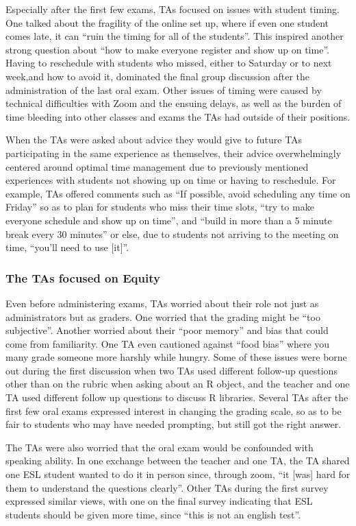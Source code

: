 \documentclass[
  letterpaper,
  DIV=11,
  numbers=noendperiod]{scrartcl}
\begin{document}
Especially after the first few exams, TAs focused on issues with student
timing. One talked about the fragility of the online set up, where if
even one student comes late, it can ``ruin the timing for all of the
students''. This inspired another strong question about ``how to make
everyone register and show up on time''. Having to reschedule with
students who missed, either to Saturday or to next week,and how to avoid
it, dominated the final group discussion after the administration of the
last oral exam. Other issues of timing were caused by technical
difficulties with Zoom and the ensuing delays, as well as the burden of
time bleeding into other classes and exams the TAs had outside of their
positions.

When the TAs were asked about advice they would give to future TAs
participating in the same experience as themselves, their advice
overwhelmingly centered around optimal time management due to previously
mentioned experiences with students not showing up on time or having to
reschedule. For example, TAs offered comments such as ``If possible,
avoid scheduling any time on Friday'' so as to plan for students who
miss their time slots, ``try to make everyone schedule and show up on
time'', and ``build in more than a 5 minute break every 30 minutes'' or
else, due to students not arriving to the meeting on time, ``you'll need
to use {[}it{]}''.

\hypertarget{the-tas-focused-on-equity}{%
\subsubsection{The TAs focused on
Equity}\label{the-tas-focused-on-equity}}

Even before administering exams, TAs worried about their role not just
as administrators but as graders. One worried that the grading might be
``too subjective''. Another worried about their ``poor memory'' and bias
that could come from familiarity. One TA even cautioned against ``food
bias'' where you many grade someone more harshly while hungry. Some of
these issues were borne out during the first discussion when two TAs
used different follow-up questions other than on the rubric when asking
about an R object, and the teacher and one TA used different follow up
questions to discuss R libraries. Several TAs after the first few oral
exams expressed interest in changing the grading scale, so as to be fair
to students who may have needed prompting, but still got the right
answer.

The TAs were also worried that the oral exam would be confounded with
speaking ability. In one exchange between the teacher and one TA, the TA
shared one ESL student wanted to do it in person since, through zoom,
``it {[}was{]} hard for them to understand the questions clearly''.
Other TAs during the first survey expressed similar views, with one on
the final survey indicating that ESL students should be given more time,
since ``this is not an english test''.
\end{document}
